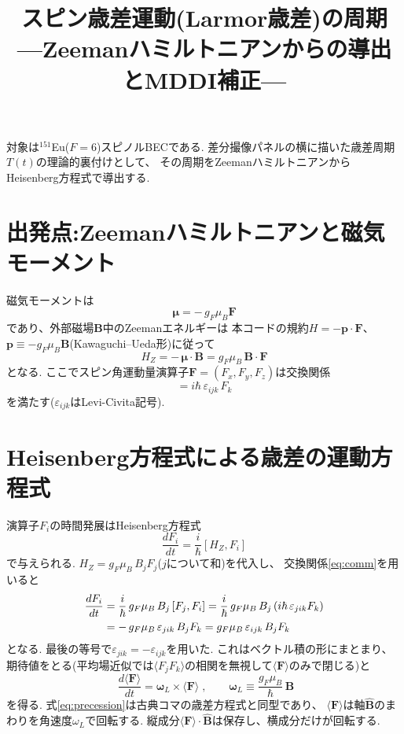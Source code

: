 \documentclass[11pt]{ltjsarticle}
\title{スピン歳差運動(Larmor歳差)の周期\\
\normalsize---Zeemanハミルトニアンからの導出とMDDI補正---}
\author{}
\date{}
\newcommand{\Fv}{\bm{F}}
\newcommand{\Bv}{\bm{B}}
\newcommand{\expv}[1]{\langle #1 \rangle}
\begin{document}
\maketitle

対象は${}^{151}$Eu($F=6$)スピノルBECである.
差分撮像パネルの横に描いた歳差周期$T(t)$の理論的裏付けとして、
その周期をZeemanハミルトニアンからHeisenberg方程式で導出する.

\section{出発点:Zeemanハミルトニアンと磁気モーメント}

磁気モーメントは
\begin{equation}
  \bm{\mu} = -\,g_F\mu_B\Fv
\end{equation}
であり、外部磁場$\Bv$中のZeemanエネルギーは
本コードの規約$H=-\bm{p}\cdot\Fv$、$\bm{p}\equiv-g_F\mu_B\Bv$(Kawaguchi--Ueda形)に従って
\begin{equation}
  H_Z = -\,\bm{\mu}\cdot\Bv = g_F\mu_B\,\Bv\cdot\Fv
\end{equation}
となる.
ここでスピン角運動量演算子$\Fv=(F_x,F_y,F_z)$は交換関係
\begin{equation}
  [F_i,F_j] = i\hbar\,\varepsilon_{ijk}\,F_k
  \label{eq:comm}
\end{equation}
を満たす($\varepsilon_{ijk}$はLevi-Civita記号).

\section{Heisenberg方程式による歳差の運動方程式}

演算子$F_i$の時間発展はHeisenberg方程式
\begin{equation}
  \frac{dF_i}{dt} = \frac{i}{\hbar}[H_Z,F_i]
\end{equation}
で与えられる.
$H_Z=g_F\mu_B\,B_j F_j$($j$について和)を代入し、
交換関係\eqref{eq:comm}を用いると
\begin{align}
  \frac{dF_i}{dt}
  &= \frac{i}{\hbar}\,g_F\mu_B\,B_j\,[F_j,F_i]
   = \frac{i}{\hbar}\,g_F\mu_B\,B_j\,(i\hbar\,\varepsilon_{jik}F_k) \notag\\
  &= -\,g_F\mu_B\,\varepsilon_{jik}\,B_j F_k
   = g_F\mu_B\,\varepsilon_{ijk}\,B_j F_k
\end{align}
となる.
最後の等号で$\varepsilon_{jik}=-\varepsilon_{ijk}$を用いた.
これはベクトル積の形にまとまり、期待値をとる(平均場近似では$\langle F_jF_k\rangle$の相関を無視して$\expv{\Fv}$のみで閉じる)と
\begin{equation}
  \boxed{\;\frac{d\expv{\Fv}}{dt} = \bm{\omega}_L\times\expv{\Fv}\;},
  \qquad
  \bm{\omega}_L\equiv\frac{g_F\mu_B}{\hbar}\,\Bv
  \label{eq:precession}
\end{equation}
を得る.
式\eqref{eq:precession}は古典コマの歳差方程式と同型であり、
$\expv{\Fv}$は軸$\hat{\Bv}$のまわりを角速度$\omega_L$で回転する.
縦成分$\expv{\Fv}\cdot\hat{\Bv}$は保存し、横成分だけが回転する.
\end{document}
